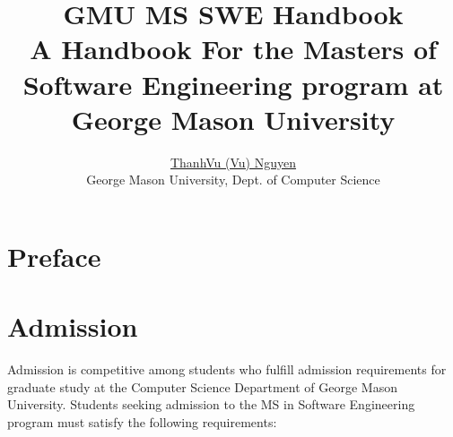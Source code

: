 \documentclass[oneside,11pt]{memoir}
\title{GMU MS SWE Handbook\\{\large A Handbook For the Masters of Software Engineering program at George Mason University}}
\author{\href{https://nguyenthanhvuh.github.io}{ThanhVu (Vu) Nguyen}\\{\small George Mason University, Dept. of Computer Science}}
\makeatletter
\def\maketitle{%
  \null
  \thispagestyle{empty}%
  \vfill
  \begin{center}\leavevmode
    \normalfont
    {\LARGE\raggedright \textbf{\@title}\par}%
    \vfill%
    {\Large \@author\par}%
    \vfill%
    {\large\raggedleft \@date\par}%
  \end{center}%
  \vfill
  \null
  \cleardoublepage
}
\makeatother
\begin{document}
\maketitle
\frontmatter

\chapter{Preface}

\newpage
\tableofcontents*

\mainmatter

\chapter{Admission}

Admission is competitive among students who fulfill admission requirements for graduate study at the Computer Science Department of George Mason University.
Students seeking admission to the MS in Software Engineering program must satisfy the following requirements:
\end{document}
